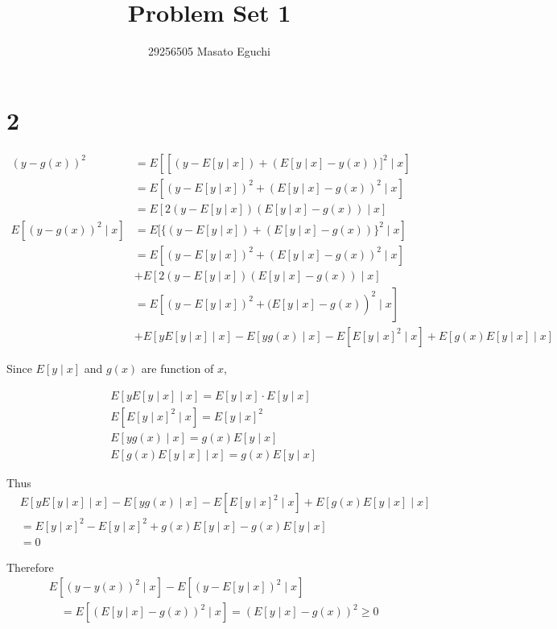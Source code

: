 \documentclass[a4paper,11pt]{article}
\title{\vspace{-20mm}Problem Set 1}
\author{29256505 Masato Eguchi}
\date{}
\begin{document}
\maketitle

\section*{2}
$$
\begin{aligned}
(y-g(x))^2 & =E\left[\left[(y-E[y \mid x])+(E[y \mid x]-y(x))]^2 \mid x\right]\right. \\
& =E\left[(y-E[y \mid x])^2+(E[y \mid x]-g(x))^2 \mid x\right] \\
& =E[2(y-E[y \mid x])(E[y \mid x]-g(x)) \mid x] \\
E\left[(y-g(x))^2 \mid x\right] & \left.=E[\{(y-E[y \mid x])+(E[y \mid x]-g(x))\}^2 \mid x\right] \\
& =E\left[(y-E[y \mid x])^2+(E[y \mid x]-g(x))^2 \mid x\right] \\
& +E[2(y-E[y \mid x])(E[y \mid x]-g(x)) \mid x] \\
& \left.=E\left[(y-E[y \mid x])^2+(E[y \mid x]-g(x)\right)^2 \mid x\right] \\
& +E[y E[y \mid x] \mid x]-E[y g(x) \mid x]-E\left[E[y \mid x]^2 \mid x\right]+E[g(x) E[y \mid x] \mid x]
\end{aligned}
$$

Since $E[y \mid x]$ and $g(x)$ are function of $x$,

$$
\begin{aligned}
& E[y E[y \mid x] \mid x]=E[y \mid x] \cdot E[y \mid x] \\
& E[E[y \mid x]^2 \mid x]=E[y \mid x]^2 \\
& E[y g(x) \mid x]=g(x) E[y \mid x] \\
& E[g(x) E[y \mid x] \mid x]=g(x) E[y \mid x]
\end{aligned}
$$

Thus
$$
\begin{aligned}
& E[y E[y \mid x] \mid x]-E[y g(x) \mid x]-E\left[E[y \mid x]^2 \mid x\right]+E[g(x) E[y \mid x] \mid x] \\
& =E[y \mid x]^2-E[y \mid x]^2+g(x) E[y \mid x]-g(x) E[y \mid x] \\
& =0
\end{aligned}
$$

Therefore
$$
\begin{aligned}
& E\left[(y-y(x))^2 \mid x\right]-E\left[(y-E[y \mid x])^2 \mid x\right] \\
& \quad=E\left[(E[y \mid x]-g(x))^2 \mid x\right]=(E[y \mid x]-g(x))^2 \geq 0
\end{aligned}
$$
\end{document}
